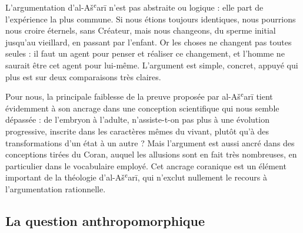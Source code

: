 L'argumentation d'al-Ašʿarī n'est pas abstraite ou logique : elle part
de l'expérience la plus commune. Si nous étions toujours identiques,
nous pourrions nous croire éternels, sans Créateur, mais nous changeons,
du sperme initial jusqu'au vieillard, en passant par l'enfant. Or les
choses ne changent pas toutes seules : il faut un agent pour penser et
réaliser ce changement, et l'homme ne saurait être cet agent pour
lui-même. L'argument est simple, concret, appuyé qui plus est sur deux
comparaisons très claires.

Pour nous, la principale faiblesse de la preuve proposée par al-Ašʿarī
tient évidemment à son ancrage dans une conception scientifique qui nous
semble dépassée : de l'embryon à l'adulte, n'assiste-t-on pas plus à une
évolution progressive, inscrite dans les caractères mêmes du vivant,
plutôt qu'à des transformations d'un état à un autre ? Mais l'argument
est aussi ancré dans des conceptions tirées du Coran, auquel les
allusions sont en fait très nombreuses, en particulier dans le
vocabulaire employé. Cet ancrage coranique est un élément important de
la théologie d'al-Ašʿarī, qui n'exclut nullement le recours à
l'argumentation rationnelle.

 
  \subsection{La question anthropomorphique}
 

